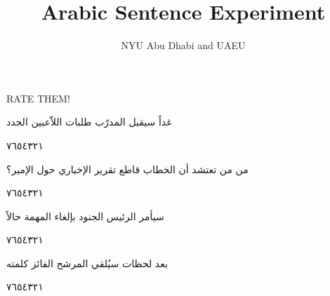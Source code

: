 \documentclass[11pt, a4paper]{article}
\begin{document}
	\title{Arabic Sentence Experiment}
	\author{NYU Abu Dhabi and UAEU}
	
	\maketitle
	
	{RATE THEM!}
	
	\vfill\clearpage
	
	{\begin{flushright}
\textarabic{غداً سيقبل المدرّب طلبات اللاّعبين الجدد}
\end{flushright}

\begin{center}
        \hfill\textarabic{٧}\hfill\textarabic{٦}\hfill\textarabic{٥}\hfill\textarabic{٤}\hfill\textarabic{٣}\hfill\textarabic{٢}\hfill\textarabic{١}
        \end{center}


\vspace{0.5\baselineskip}\begin{flushright}
\textarabic{من من تعتشد أن الخطاب قاطع تقرير الإخباري حول الإمير؟}
\end{flushright}

\begin{center}
        \hfill\textarabic{٧}\hfill\textarabic{٦}\hfill\textarabic{٥}\hfill\textarabic{٤}\hfill\textarabic{٣}\hfill\textarabic{٢}\hfill\textarabic{١}
        \end{center}


\vspace{0.5\baselineskip}\begin{flushright}
\textarabic{سيأمر الرئيس الجنود بإلغاء المهمة حالاً}
\end{flushright}

\begin{center}
        \hfill\textarabic{٧}\hfill\textarabic{٦}\hfill\textarabic{٥}\hfill\textarabic{٤}\hfill\textarabic{٣}\hfill\textarabic{٢}\hfill\textarabic{١}
        \end{center}


\vspace{0.5\baselineskip}\begin{flushright}
\textarabic{بعد لحظات سيُلقي المرشح الفائز كلمته}
\end{flushright}

\begin{center}
        \hfill\textarabic{٧}\hfill\textarabic{٦}\hfill\textarabic{٥}\hfill\textarabic{٤}\hfill\textarabic{٣}\hfill\textarabic{٢}\hfill\textarabic{١}
        \end{center}


}
\end{document}
